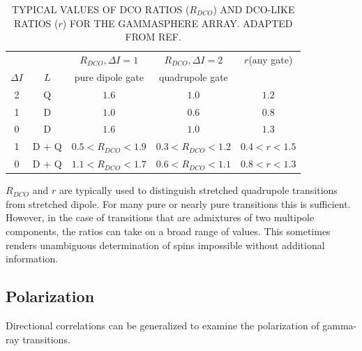 \begin{table}[t]
\caption[TYPICAL VALUES OF DCO RATIOS AND DCO-LIKE RATIOS FOR THE GAMMASPHERE ARRAY.]{TYPICAL VALUES OF DCO RATIOS ($R_{DCO}$) AND DCO-LIKE RATIOS ($r$) FOR THE GAMMASPHERE ARRAY. ADAPTED FROM REF. \cite{dcoLike}\label{tbl:chp3-dco-ratios}}
\centering
\begin{tabular}{ccccc}
\toprule
& & $R_{DCO}, \Delta{}I=1$ & $R_{DCO}, \Delta{}I=2$ & $r$(any gate)\\
$\Delta I$ & $L$ & pure dipole gate & quadrupole gate & \\
\midrule
2 & Q     & $1.6$             & $1.0$             & $1.2$\\
1 & D     & $1.0$             & $0.6$             & $0.8$\\
0 & D     & $1.6$             & $1.0$             & $1.3$\\
1 & D + Q & $0.5<R_{DCO}<1.9$ & $0.3<R_{DCO}<1.2$ & $0.4<r<1.5$\\
0 & D + Q & $1.1<R_{DCO}<1.7$ & $0.6<R_{DCO}<1.1$ & $0.8<r<1.3$\\
\bottomrule
\end{tabular}
\end{table}

$R_{DCO}$ and $r$ are typically used to distinguish stretched quadrupole transitions from stretched dipole. For many pure or nearly pure transitions this is sufficient. However, in the case of transitions that are admixtures of two multipole components, the ratios can take on a broad range of values. This sometimes renders unambiguous determination of spins impossible without additional information.

\subsection{Polarization}
\label{ssec:exp-pol}
Directional correlations can be generalized to examine the polarization of gamma-ray transitions. 